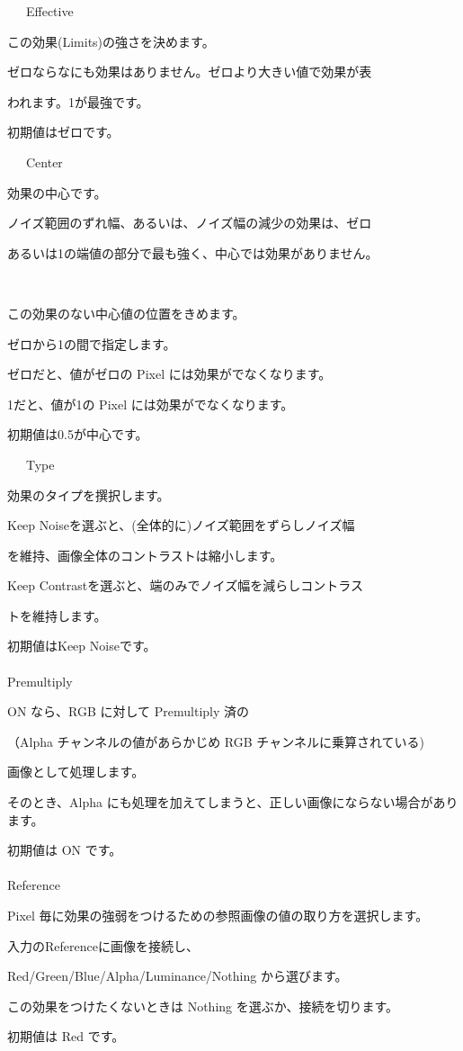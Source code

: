 \documentclass[a4paper,12pt]{article}
\begin{document}
\par
\noindent \ \ \, Effective\par
この効果(Limits)の強さを決めます。\par
ゼロならなにも効果はありません。ゼロより大きい値で効果が表\par
われます。1が最強です。\par
初期値はゼロです。\\
\par
\noindent \ \ \, Center\par
効果の中心です。\par
ノイズ範囲のずれ幅、あるいは、ノイズ幅の減少の効果は、ゼロ\par
あるいは1の端値の部分で最も強く、中心では効果がありません。

\newpage

\thispagestyle{empty}

\ \vspace{-0.2em}
\par
この効果のない中心値の位置をきめます。\par
ゼロから1の間で指定します。\par
ゼロだと、値がゼロの Pixel には効果がでなくなります。\par
1だと、値が1の Pixel には効果がでなくなります。\par
初期値は0.5が中心です。\\
\par
\noindent \ \ \, Type\par
効果のタイプを撰択します。\par
\textquotedbl Keep Noise\textquotedbl を選ぶと、(全体的に)ノイズ範囲をずらしノイズ幅\par
を維持、画像全体のコントラストは縮小します。\par
\textquotedbl Keep Contrast\textquotedbl を選ぶと、端のみでノイズ幅を減らしコントラス\par
トを維持します。\par
初期値は\textquotedbl Keep Noise\textquotedbl です。\\
\\
Premultiply\par
ON なら、RGB に対して Premultiply 済の\par
（Alpha チャンネルの値があらかじめ RGB チャンネルに乗算されている)\par
画像として処理します。\par
そのとき、Alpha にも処理を加えてしまうと、正しい画像にならない場合があります。\par
初期値は ON です。\\
\\
Reference\par
Pixel 毎に効果の強弱をつけるための参照画像の値の取り方を選択します。\par
入力の\textquotedbl Reference\textquotedbl に画像を接続し、\par
Red/Green/Blue/Alpha/Luminance/Nothing から選びます。\par
この効果をつけたくないときは Nothing を選ぶか、接続を切ります。\par
初期値は Red です。
\end{document}
